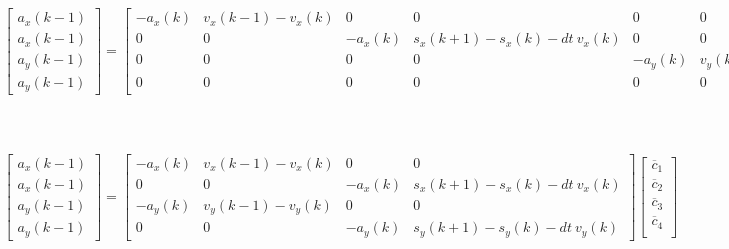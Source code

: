 \documentclass[10pt]{article}         %
\begin{document}
\begin{align}
    \begin{bmatrix}
        a_x(k-1) \\ 
        a_x(k-1) \\ 
        a_y(k-1) \\ 
        a_y(k-1)       
    \end{bmatrix}
    =
    \begin{bmatrix}
         -a_x(k)  & v_x(k-1) - v_x(k)  & 0 & 0                  & 0 & 0 & 0 & 0    \\
         0 & 0 & -a_x(k) &    s_x(k+1) - s_x(k) - dt \  v_x(k)  & 0 & 0 & 0 & 0    \\
         0 & 0 & 0 & 0 & -a_y(k)  & v_y(k-1) - v_y(k)  & 0 & 0 \\
         0 & 0 & 0 & 0 & 0 & 0 & -a_y(k) &    s_y(k+1) - s_y(k) - dt \  v_y(k)
    \end{bmatrix}
    \begin{bmatrix}
        \overline c_{x1} \\
        \overline c_{x2} \\
        \overline c_{x3} \\
        \overline c_{x4} \\
        \overline c_{y1} \\
        \overline c_{y2} \\
        \overline c_{y3} \\
        \overline c_{y4} \\
    \end{bmatrix}
\end{align}


\begin{align}
    \begin{bmatrix}
        a_x(k-1) \\ 
        a_x(k-1) \\ 
        a_y(k-1) \\ 
        a_y(k-1)       
    \end{bmatrix}
    =
    \begin{bmatrix}
        -a_x(k)  & v_x(k-1) - v_x(k)  & 0 & 0                   \\ 
        0 & 0 & -a_x(k) &    s_x(k+1) - s_x(k) - dt \  v_x(k)   \\ 
        -a_y(k)  & v_y(k-1) - v_y(k)  & 0 & 0                   \\
        0 & 0 & -a_y(k) &    s_y(k+1) - s_y(k) - dt \  v_y(k)
    \end{bmatrix}
    \begin{bmatrix}
        \overline c_1 \\
        \overline c_2 \\
        \overline c_3 \\
        \overline c_4 \\
   \end{bmatrix}
\end{align}
\end{document}
